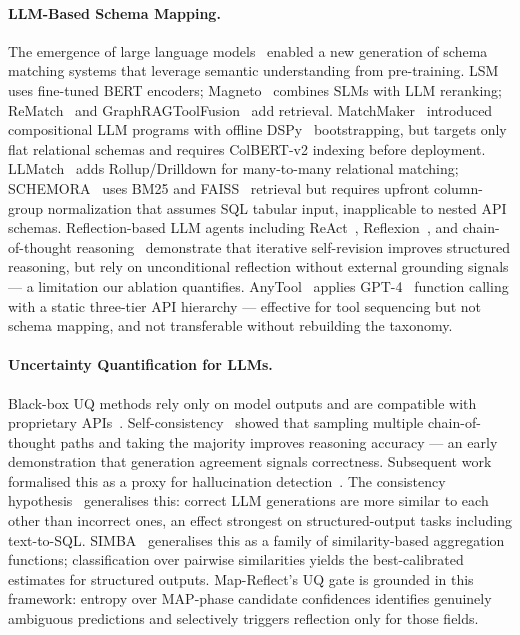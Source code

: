 \documentclass[sigconf, nonacm]{acmart}
\begin{document}
\paragraph{LLM-Based Schema Mapping.} The emergence of large language models~\cite{brown2020language,ouyang2022training} enabled a new generation of schema matching systems that leverage semantic understanding from pre-training. LSM~\cite{zhang2023schema} uses fine-tuned BERT encoders; Magneto~\cite{liu2024magneto} combines SLMs with LLM reranking; ReMatch~\cite{sheetrit2024rematch} and GraphRAGToolFusion~\cite{lumer2025graphragtoolfusion} add retrieval. MatchMaker~\cite{matchmaker} introduced compositional LLM programs with offline DSPy~\cite{khattab2023dspy} bootstrapping, but targets only flat relational schemas and requires ColBERT-v2 indexing before deployment. LLMatch~\cite{wang2025llmatch} adds Rollup/Drilldown for many-to-many relational matching; SCHEMORA~\cite{gungor2025schemora} uses BM25 and FAISS~\cite{johnson2019billion} retrieval but requires upfront column-group normalization that assumes SQL tabular input, inapplicable to nested API schemas. Reflection-based LLM agents including ReAct~\cite{yao2023react}, Reflexion~\cite{shinn2023reflexion}, and chain-of-thought reasoning~\cite{wei2022chain} demonstrate that iterative self-revision improves structured reasoning, but rely on unconditional reflection without external grounding signals — a limitation our ablation quantifies. AnyTool~\cite{anytool} applies GPT-4~\cite{achiam2023gpt4} function calling with a static three-tier API hierarchy — effective for tool sequencing but not schema mapping, and not transferable without rebuilding the taxonomy.

\paragraph{Uncertainty Quantification for LLMs.}
Black-box UQ methods rely only on model outputs and are compatible with proprietary APIs~\cite{xiao2025consistency,simba2025}. Self-consistency~\cite{wang2023selfconsistency} showed that sampling multiple chain-of-thought paths and taking the majority improves reasoning accuracy — an early demonstration that generation agreement signals correctness. Subsequent work formalised this as a proxy for hallucination detection~\cite{lin2024generating,manakul2023selfcheck}. The consistency hypothesis~\cite{xiao2025consistency} generalises this: correct LLM generations are more similar to each other than incorrect ones, an effect strongest on structured-output tasks including text-to-SQL. SIMBA~\cite{simba2025} generalises this as a family of similarity-based aggregation functions; classification over pairwise similarities yields the best-calibrated estimates for structured outputs. Map-Reflect's UQ gate is grounded in this framework: entropy over MAP-phase candidate confidences identifies genuinely ambiguous predictions and selectively triggers reflection only for those fields.
\end{document}
